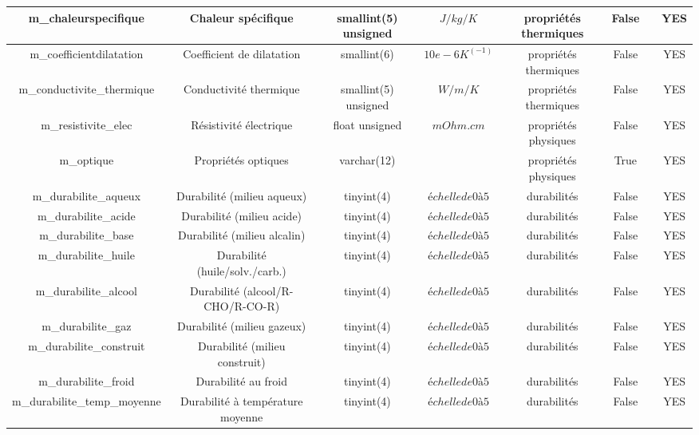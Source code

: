\documentclass[12pt,a4paper]{article}
\begin{document}
\begin{table}
\begin{center}
\begin{tabular}{|c|c|c|c|c|c|c|c|}
                \hline
                m\_chaleurspecifique & Chaleur spécifique & smallint(5) unsigned & $J/kg/K$ & propriétés thermiques & False &  & YES \\
                \hline
                m\_coefficientdilatation & Coefficient de dilatation & smallint(6) & $10e-6 K^(-1)$ & propriétés thermiques & False &  & YES \\
                \hline
                m\_conductivite\_thermique & Conductivité thermique & smallint(5) unsigned & $W/m/K$ & propriétés thermiques & False &  & YES \\
                \hline
                m\_resistivite\_elec & Résistivité électrique & float unsigned & $mOhm.cm$ & propriétés physiques & False &  & YES \\
                \hline
                m\_optique & Propriétés optiques & varchar(12) & $ $ & propriétés physiques & True &  & YES \\
                \hline
                m\_durabilite\_aqueux & Durabilité (milieu aqueux) & tinyint(4) & $échelle de 0 à 5$ & durabilités & False &  & YES \\
                \hline
                m\_durabilite\_acide & Durabilité (milieu acide) & tinyint(4) & $échelle de 0 à 5$ & durabilités & False &  & YES \\
                \hline
                m\_durabilite\_base & Durabilité (milieu alcalin) & tinyint(4) & $échelle de 0 à 5$ & durabilités & False &  & YES \\
                \hline
                m\_durabilite\_huile & Durabilité (huile/solv./carb.) & tinyint(4) & $échelle de 0 à 5$ & durabilités & False &  & YES \\
                \hline
                m\_durabilite\_alcool & Durabilité (alcool/R-CHO/R-CO-R) & tinyint(4) & $échelle de 0 à 5$ & durabilités & False &  & YES \\
                \hline
                m\_durabilite\_gaz & Durabilité (milieu gazeux) & tinyint(4) & $échelle de 0 à 5$ & durabilités & False &  & YES \\
                \hline
                m\_durabilite\_construit & Durabilité (milieu construit) & tinyint(4) & $échelle de 0 à 5$ & durabilités & False &  & YES \\
                \hline
                m\_durabilite\_froid & Durabilité au froid & tinyint(4) & $échelle de 0 à 5$ & durabilités & False &  & YES \\
                \hline
                m\_durabilite\_temp\_moyenne & Durabilité à température moyenne & tinyint(4) & $échelle de 0 à 5$ & durabilités & False &  & YES \\

\end{tabular}
\end{center}
\end{table}
\end{document}
